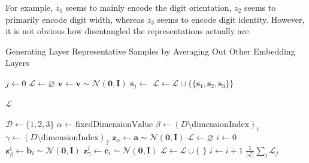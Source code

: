 For example, $z_1$ seems to mainly encode the digit orientation, $z_2$ seems to primarily encode digit width, whereas $z_3$ seems to encode digit identity.
However, it is not obvious how disentangled the representations actually are.
\begin{breakablealgorithm}
    \caption{Generating Layer Representative Samples by Averaging Out Other Embedding Layers}\label{alg:layer_representative_samples}
    \begin{algorithmic}[1]
        \State $j \gets 0$
        \State $\mathcal{L}\gets \varnothing$
        \State $\bm{v} \gets \bm{v} \sim \mathcal{N}(\bm{0}, \bm{I})$\label{line:fixing_v}
        \State $\bm{s}_j \gets$ 
        \EndFor
        \State $\mathcal{L} \gets \mathcal{L} \cup \{\{\bm{s}_1, \bm{s}_2, \bm{s}_3\}\}$

        \EndWhile
        \State \Return $\mathcal{L}$
        \EndFunction

        \State $\mathcal{D} \gets \{1,2,3\}$
        \State $\alpha \gets \text{fixedDimensionValue}$
        \State $\beta \gets (D \setminus \text{dimensionIndex})_1$
        \State $\gamma \gets (D \setminus \text{dimensionIndex})_2$
        \State $\bm{z}_{\alpha} \gets \bm{a} \sim \mathcal{N}(\bm{0}, \bm{I})$
        \State $\mathcal{L}\gets \varnothing$
        \State $i \gets 0$
        \State $\bm{z}_{\beta}^i \gets \bm{b}_i \sim \mathcal{N}(\bm{0}, \bm{I})$
        \State $\bm{z}_{\gamma}^i \gets \bm{c}_i \sim \mathcal{N}(\bm{0}, \bm{I})$
        \State $\mathcal{L} \gets \mathcal{L} \cup \{$  $\}$
        \State $i \gets i + 1$
        \EndWhile
        \State \Return $\frac{1}{|\mathcal{L}|}\sum_j \mathcal{L}_j$
        \EndFunction
    \end{algorithmic}
\end{breakablealgorithm}

